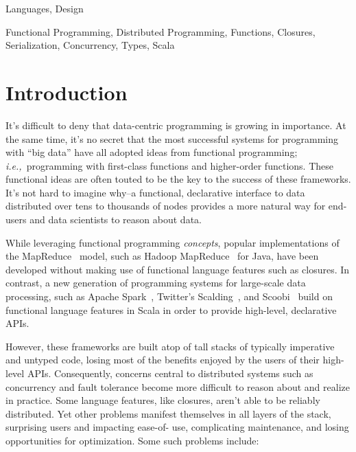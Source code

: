 \documentclass[preprint]{sigplanconf}
\theoremstyle{definition}
\theoremstyle{definition}
\newcommand{\ie}{{\em i.e.,~}}
\begin{document}
\terms
Languages, Design

\keywords
Functional Programming, Distributed Programming, Functions, Closures,
Serialization, Concurrency, Types, Scala

\section{Introduction}

It's difficult to deny that data-centric programming is growing in importance.
At the same time, it's no secret that the most successful systems for
programming with ``big data'' have all adopted ideas from functional
programming; \ie programming with first-class functions and higher-order
functions. These functional ideas are often touted to be the key to the
success of these frameworks. It's not hard to imagine why--a functional,
declarative interface to data distributed over tens to thousands of nodes
provides a more natural way for end-users and data scientists to reason about
data.

While leveraging functional programming {\em concepts}, popular
implementations of the MapReduce~\cite{MapReduce} model, such as Hadoop
MapReduce~\cite{Hadoop} for Java, have been developed without making use of
functional language features such as closures. In contrast, a new generation
of programming systems for large-scale data processing, such as Apache
Spark~\cite{Spark}, Twitter's Scalding~\cite{Scalding}, and
Scoobi~\cite{Scoobi} build on functional language features in Scala in order
to provide high-level, declarative APIs.




However, these frameworks are built atop of tall stacks of typically
imperative and untyped code, losing most of the benefits enjoyed by the users
of their high-level APIs. Consequently, concerns central to distributed
systems such as concurrency and fault tolerance become more difficult to
reason about and realize in practice. Some language features, like closures,
aren't able to be reliably distributed. Yet other problems manifest themselves
in all layers of the stack, surprising users and impacting ease-of- use,
complicating maintenance, and losing opportunities for optimization. Some such
problems include:
\end{document}
